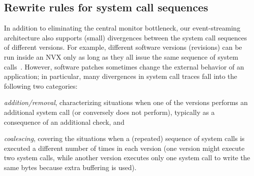 

\subsection{Rewrite rules for system call sequences}
\label{sec:rw}

In addition to eliminating the central monitor bottleneck, our
event-streaming architecture also supports (small) divergences between
the system call sequences of different versions.  For example,
different software versions (revisions) can be run inside an NVX only
as long as they all issue the same sequence of system calls~\cite{mx}.
However, software patches sometimes change the external behavior of an
application; in particular, many divergences in system call traces
fall into the following two categories:
\begin{inparaenum}[(i)]
\item \emph{addition/removal}, characterizing situations when one
  of the versions performs an additional system call (or conversely
  does not perform), typically as a consequence of an additional
  check, and
\item \emph{coalescing}, covering the situations when a (repeated)
  sequence of system calls is executed a different number of times
  in each version (\eg one version might execute two  system calls,
  while another version executes only one  system call to write the
  same bytes because extra buffering is used).  
\end{inparaenum}


